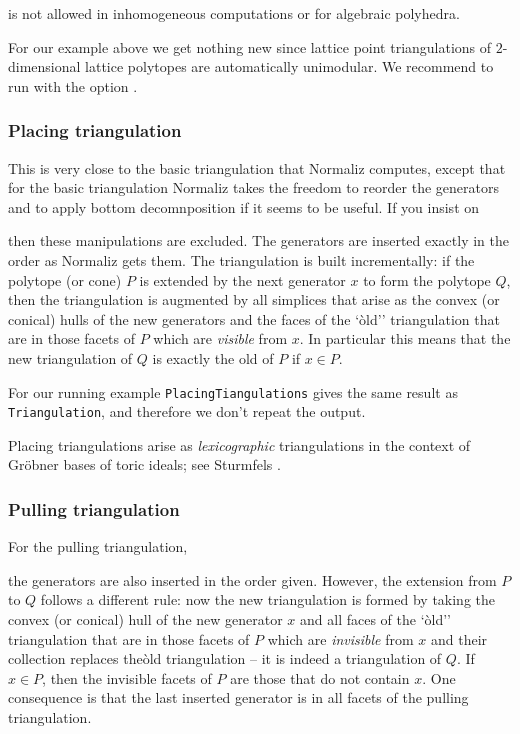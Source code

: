  is not allowed in inhomogeneous computations or for algebraic polyhedra.

For our example above we get nothing new since lattice point triangulations of $2$-dimensional lattice polytopes are automatically unimodular. We recommend to run  with the option .

\subsubsection{Placing triangulation}\label{PlacingTri}

This is very close to the basic triangulation that Normaliz computes, except that for the basic triangulation Normaliz takes the freedom to reorder the generators and to apply bottom decomnposition if it seems to be useful. If you insist on
\begin{itemize}
	\itemtt[PlacingTriangulation]
\end{itemize}
then these manipulations are excluded. The generators are inserted exactly in the order as Normaliz gets them. The triangulation is built incrementally: if the polytope (or cone) $P$ is extended by the next generator $x$ to form the polytope $Q$, then the triangulation is augmented by all simplices that arise as the convex (or conical) hulls of the new generators and the faces of the `òld'' triangulation that are in those facets of $P$ which are \emph{visible} from $x$. In particular this means that the new triangulation of $Q$ is exactly the old of $P$ if $x\in P$.

For our running example \verb|PlacingTiangulations| gives the same result as \verb|Triangulation|, and therefore we don't repeat the output.

Placing triangulations arise as \emph{lexicographic} triangulations in the context of Gröbner bases of toric ideals; see Sturmfels \cite[p. 67]{Stu}.

\subsubsection{Pulling triangulation}\label{PullingTri}

For the pulling triangulation,
\begin{itemize}
	\itemtt[PullingTriangulation]
\end{itemize}
the generators are also inserted in the order given. However, the extension from $P$ to $Q$ follows a different rule: now the new triangulation is formed by taking the convex (or conical) hull of the new generator $x$ and all  faces of the `òld'' triangulation that are in those facets of $P$ which are \emph{invisible} from $x$ and their collection replaces theòld triangulation -- it is indeed a triangulation of $Q$. If $x\in P$, then the invisible facets of $P$ are those that do not contain $x$. One consequence is that the last inserted generator is in all facets of the pulling triangulation. 

